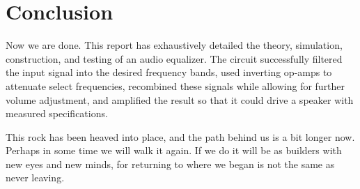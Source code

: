 \documentclass[notitlepage, 12pt]{report}
\begin{document}
\section*{Conclusion}

Now we are done. This report has exhaustively detailed the theory, simulation, 
construction, and testing of an audio equalizer. The circuit successfully 
filtered the input signal into the desired frequency bands, 
used inverting op-amps to attenuate select frequencies, 
recombined these signals while allowing for further volume adjustment, 
and amplified the result so that it could drive a speaker with measured specifications. 

This rock has been heaved into place, and the path behind us is a bit longer now. Perhaps 
in some time we will walk it again. If we do it will be as builders with new eyes 
and new minds, for returning to where we began is not the same as never leaving. 


\printbibliography[title={\Large References}]
\end{document}

